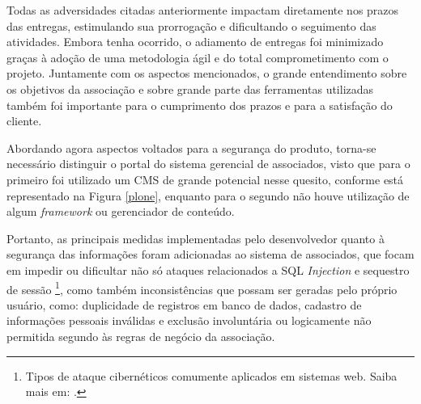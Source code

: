 Todas as adversidades citadas anteriormente impactam diretamente nos prazos das entregas, estimulando sua prorrogação e dificultando o seguimento das atividades. Embora tenha ocorrido, o adiamento de entregas foi minimizado graças à adoção de uma metodologia ágil e do total comprometimento com o projeto. Juntamente com os aspectos mencionados, o grande entendimento sobre os objetivos da associação e sobre grande parte das ferramentas utilizadas também foi importante para o cumprimento dos prazos e para a satisfação do cliente.

Abordando agora aspectos voltados para a segurança do produto, torna-se necessário distinguir o portal do sistema gerencial de associados, visto que para o primeiro foi utilizado um CMS de grande potencial nesse quesito, conforme está representado na Figura \ref{plone}, enquanto para o segundo não houve utilização de algum \textit{framework} ou gerenciador de conteúdo. 

Portanto, as principais medidas implementadas pelo desenvolvedor quanto à segurança das informações foram adicionadas ao sistema de associados, que focam em impedir ou dificultar não só ataques relacionados a SQL \textit{Injection} e sequestro de sessão \footnote{Tipos de ataque cibernéticos comumente aplicados em sistemas web. Saiba mais em: .}, como também inconsistências que possam ser geradas pelo próprio usuário, como: duplicidade de registros em banco de dados, cadastro de informações pessoais inválidas e exclusão involuntária ou logicamente não permitida segundo às regras de negócio da associação.

